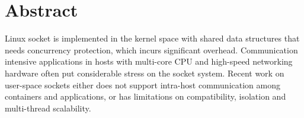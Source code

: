 \section*{Abstract}

Linux socket is implemented in the kernel space with shared data structures that needs concurrency protection, which incurs significant overhead.
Communication intensive applications in hosts with multi-core CPU and high-speed networking hardware often put considerable stress on the socket system.
Recent work on user-space sockets either does not support intra-host communication among containers and applications, or has limitations on compatibility, isolation and multi-thread scalability.



